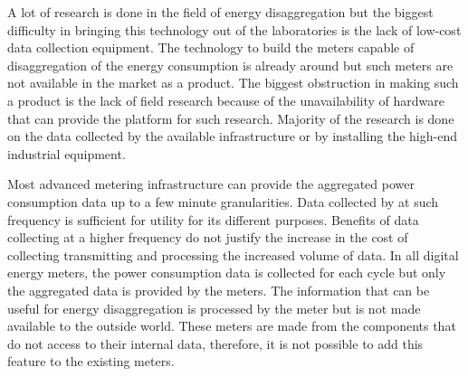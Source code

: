 A lot of research is done in the field of energy disaggregation but the biggest difficulty in bringing this technology out of the laboratories is the lack of low-cost data collection equipment.  The technology to build the meters capable of disaggregation of the energy consumption is already around but such meters are not available in the market as a product. The biggest obstruction in making such a product is the lack of field research because of the unavailability of hardware that can provide the platform for such research. Majority of the research is done on the data collected by the available infrastructure or by installing the high-end industrial equipment.

Most advanced metering infrastructure can provide the aggregated power consumption data up to a few minute granularities. Data collected by at such frequency is sufficient for utility for its different purposes. Benefits of data collecting at a higher frequency do not justify the increase in the cost of collecting transmitting and processing the increased volume of data. In all digital energy meters, the power consumption data is collected for each cycle but only the aggregated data is provided by the meters. The information that can be useful for energy disaggregation is processed by the meter but is not made available to the outside world.  These meters are made from the components that do not access to their internal data, therefore, it is not possible to add this feature to the existing meters.
